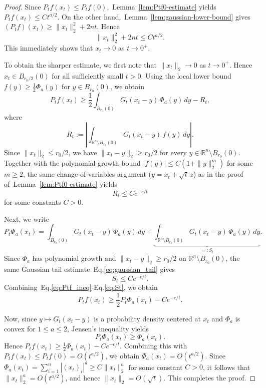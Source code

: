 \documentclass{article}
\begin{document}
\begin{proof}
Since $P_t f(x_t)\le P_t f(0)$,~Lemma~\ref{lem:Ptf0-estimate} yields $P_t f(x_t)\le Ct^{a/2}$. On the other hand,~Lemma~\ref{lem:gaussian-lower-bound} gives $(P_t f)(x_t)\ge \|x_t\|_2^2+2nt$. Hence
$$\|x_t\|_2^2+2nt\le Ct^{a/2}.$$
This immediately shows that $x_t\to0$ as $t\to0^+$.

To obtain the sharper estimate, we first note that $\|x_t\|_2\to0$ as $t\to0^+$. Hence $x_t\in B_{r_0/2}(0)$ for all sufficiently small $t>0$. Using the local lower bound $f(y)\ge \frac12\Phi_a(y)$ for $y\in B_{r_0}(0)$, we obtain
\begin{equation}\label{eq:Ptf_ineq}
    P_t f(x_t)\ge \frac12\int_{B_{r_0}(0)} G_t(x_t-y)\,\Phi_a(y)\,dy-R_t,
\end{equation}
where
$$R_t:=\left|\int_{\mathbb R^n\setminus B_{r_0}(0)} G_t(x_t-y)\,f(y)\,dy\right|.$$
Since $\|x_t\|_2\le r_0/2$, we have $\|x_t-y\|_2\ge r_0/2$ for every $y\in\mathbb R^n\setminus B_{r_0}(0)$. Together with the polynomial growth bound $|f(y)|\le C(1+\|y\|_2^m)$ for some $m\ge2$, the same change-of-variables argument ($y=x_t+\sqrt{t}\,z$) as in the proof of~Lemma~\ref{lem:Ptf0-estimate} yields 
\begin{equation}\label{eq:Rt}
    R_t\le Ce^{-c/t}
\end{equation}
for some constants $C>0$.

Next, we write
$$P_t\Phi_a(x_t)=\int_{B_{r_0}(0)} G_t(x_t-y)\,\Phi_a(y)\,dy+\underbrace{\int_{\mathbb R^n\setminus B_{r_0}(0)} G_t(x_t-y)\,\Phi_a(y)\,dy}_{=:S_t}.$$
Since $\Phi_a$ has polynomial growth and $\|x_t-y\|_2\ge r_0/2$ on $\mathbb R^n\setminus B_{r_0}(0)$, the same Gaussian tail estimate~Eq.\eqref{eq:gaussian_tail} gives
\begin{equation}\label{eq:St}
    S_t\le Ce^{-c/t}.
\end{equation}
Combining~Eq.\eqref{eq:Ptf_ineq}-Eq.\eqref{eq:St}, we obtain
$$P_t f(x_t)\ge \frac12 P_t\Phi_a(x_t)-Ce^{-c/t}.$$

Now, since $y \mapsto G_t(x_t-y)$ is a probability density centered at $x_t$ and $\Phi_a$ is convex for $1\le a\le 2$, Jensen's inequality yields
$$P_t\Phi_a(x_t)\ge \Phi_a(x_t).$$
Hence $P_t f(x_t)\ge \frac12\Phi_a(x_t)-Ce^{-c/t}$. Combining this with $P_t f(x_t)\le P_t f(0)=O(t^{a/2})$, we obtain $\Phi_a(x_t)=O(t^{a/2})$. Since $\Phi_a(x_t)=\sum_{i=1}^n |(x_t)_i|^a\ge C\|x_t\|_2^a$ for some constant $C>0$, it follows that $\|x_t\|_2^a=O(t^{a/2})$, and hence $\|x_t\|_2=O(\sqrt t)$. This completes the proof.
\end{proof}
\end{document}
